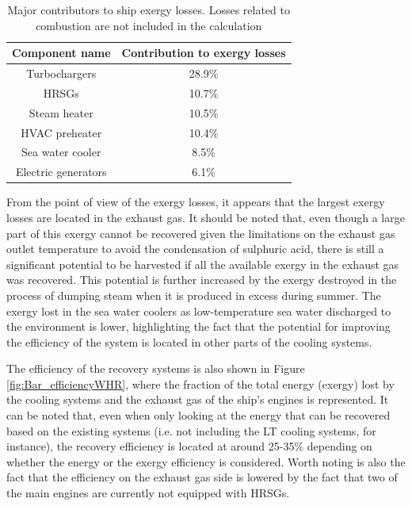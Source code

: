 \documentclass[preprint,12pt]{elsarticle}
\begin{document}
 
\begin{table}
	\centering
	\begin{tabular}{cc}
		\hline 
		Component name & Contribution to exergy losses \\ 
		\hline 
		Turbochargers & 28.9\% \\ 
		HRSGs & 10.7\% \\
		Steam heater & 10.5\% \\ 
		HVAC preheater & 10.4\% \\
		Sea water cooler & 8.5\% \\ 
		Electric generators & 6.1\% \\ 
		\hline 
	\end{tabular} 
	\caption{Major contributors to ship exergy losses. Losses related to combustion are not included in the calculation}
	\label{tab:exergyDestruction}
\end{table}

From the point of view of the exergy losses, it appears that the largest exergy losses are located in the exhaust gas. It should be noted that, even though a large part of this exergy cannot be recovered given the limitations on the exhaust gas outlet temperature to avoid the condensation of sulphuric acid, there is still a significant potential to be harvested if all the available exergy in the exhaust gas was recovered. This potential is further increased by the exergy destroyed in the process of dumping steam when it is produced in excess during summer. The exergy lost in the sea water coolers as low-temperature sea water discharged to the environment is lower, highlighting the fact that the potential for improving the efficiency of the system is located in other parts of the cooling systems. 

The efficiency of the recovery systems is also shown in Figure \ref{fig:Bar_efficiencyWHR}, where the fraction of the total energy (exergy) lost by the cooling systems and the exhaust gas of the ship's engines is represented. It can be noted that, even when only looking at the energy that can be recovered based on the existing systems (i.e. not including the LT cooling systems, for instance), the recovery efficiency is located at around 25-35\% depending on whether the energy or the exergy efficiency is considered. Worth noting is also the fact that the efficiency on the exhaust gas side is lowered by the fact that two of the main engines are currently not equipped with HRSGs. 
\end{document}
